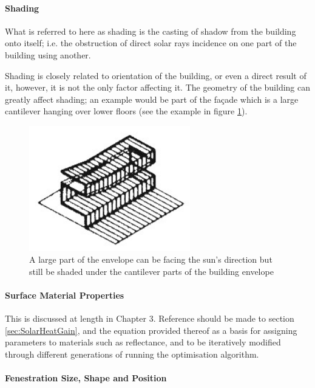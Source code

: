 \paragraph{Shading}\mbox{}

What is referred to here as shading is the casting of shadow from the building onto itself; i.e. the obstruction of direct solar rays incidence on one part of the building using another.

Shading is closely related to orientation of the building, or even a direct result of it, however, it is not the only factor affecting it. The geometry of the building can greatly affect shading; an example would be part of the fa\c{c}ade which is a large cantilever hanging over lower floors (see the example in figure \ref{fig:ShadingCntlvr}).

\begin{figure}[H]
	\centering
	\includegraphics[width=7cm]{./Images/7-Cantilever}
	\caption[Envelope Shading]{A large part of the envelope can be facing the sun's direction but still be shaded under the cantilever parts of the building envelope \cite{foa04}}
	\label{fig:ShadingCntlvr}
\end{figure}

\paragraph{Surface Material Properties}\mbox{}

This is discussed at length in Chapter 3. Reference should be made to section \ref{sec:SolarHeatGain}, and the equation provided thereof as a basis for assigning parameters to materials such as reflectance, and to be iteratively modified through different generations of running the optimisation algorithm.

\paragraph{Fenestration Size, Shape and Position}\mbox{}

